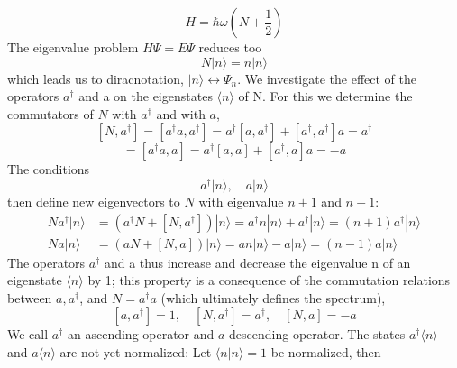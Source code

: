 \begin{equation}
    H=\hbar \omega\left(N+\frac{1}{2}\right)
    \end{equation}
The eigenvalue problem $H\Psi = E\Psi$ reduces too
\begin{equation}
    N|n\rangle= n|n\rangle
    \end{equation}
which leads us to diracnotation, $|n\rangle\leftrightarrow\Psi_n$. We investigate the effect of the operators $a^{\dagger}$ and a on the eigenstates $\langle n\rangle$ of N. For this we determine the commutators of $N$ with $a^{\dagger}$ and with $a$,
\begin{equation}
    \left[N, a^{\dagger}\right]=\left[a^{\dagger} a, a^{\dagger}\right]=a^{\dagger}\left[a, a^{\dagger}\right]+\left[a^{\dagger}, a^{\dagger}\right] a=a^{\dagger}
    \end{equation}
\begin{equation}
    [N, a]=\left[a^{\dagger} a, a\right]=a^{\dagger}[a, a]+\left[a^{\dagger}, a\right] a=-a
    \end{equation}
The conditions
\begin{equation}
    a^{\dagger}|n\rangle, \quad a|n\rangle
    \end{equation}
then define new eigenvectors to $N$ with eigenvalue $n + 1$ and $n - 1$:
\begin{equation}
\begin{aligned} N a^{\dagger}|n\rangle &=\left(a^{\dagger} N+\left[N, a^{\dagger}\right]\right)|n\rangle= a^{\dagger} n|n\rangle+ a^{\dagger}|n\rangle=(n+1) a^{\dagger}|n\rangle \\ N a|n\rangle &=(a N+[N, a])|n\rangle= a n|n\rangle- a|n\rangle=(n-1) a|n\rangle \end{aligned}
\end{equation}
The operators $a^{\dagger}$ and a thus increase and decrease the eigenvalue n of an eigenstate $\langle n\rangle$ by 1; this property is a consequence of the commutation relations between $a, a^{\dagger}$, and $N = a^{\dagger} a$ (which ultimately defines the spectrum),
\begin{equation}
    \left[a, a^{\dagger}\right]=1, \quad\left[N, a^{\dagger}\right]=a^{\dagger}, \quad[N, a]=-a
    \end{equation}
We call $a^{\dagger}$ an ascending operator and $a$ descending operator. The states $a^{\dagger}\langle n\rangle$ and $a\langle n\rangle$ are not yet normalized: Let $\langle n|n\rangle = 1$ be normalized, then
